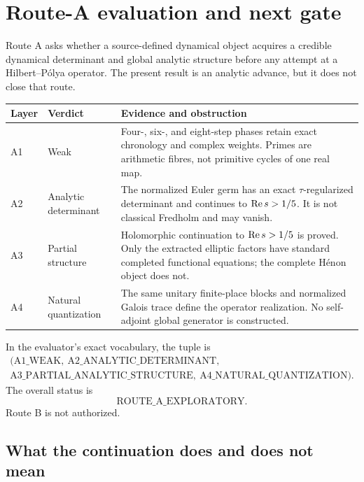 \section{Route-A evaluation and next gate}\label{sec:route-a}

Route A asks whether a source-defined dynamical object acquires a credible
dynamical determinant and global analytic structure before any attempt at a
Hilbert--P\'olya operator.  The present result is an analytic advance, but it
does not close that route.

\begin{center}
\begin{tabular}{@{}
>{\raggedright\arraybackslash}p{}
>{\raggedright\arraybackslash}p{}
>{\raggedright\arraybackslash}p{}@{}}
\toprule
Layer & Verdict & Evidence and obstruction\\
\midrule
A1 & Weak &
Four-, six-, and eight-step phases retain exact chronology and complex
weights.  Primes are arithmetic fibres, not primitive cycles of one real
map.\\
A2 & Analytic determinant &
The normalized Euler germ has an exact \(\tau\)-regularized determinant and
continues to \(\operatorname{Re} s>1/5\).  It is not classical Fredholm and may
vanish.\\
A3 & Partial structure &
Holomorphic continuation to \(\operatorname{Re} s>1/5\) is proved.  Only the extracted
elliptic factors have standard completed functional equations; the complete
H\'enon object does not.\\
A4 & Natural quantization &
The same unitary finite-place blocks and normalized Galois trace define the
operator realization.  No self-adjoint global generator is constructed.\\
\bottomrule
\end{tabular}
\end{center}

In the evaluator's exact vocabulary, the tuple is
\[
\begin{gathered}
(\mathrm{A1\_WEAK},\ \mathrm{A2\_ANALYTIC\_DETERMINANT},\\
\mathrm{A3\_PARTIAL\_ANALYTIC\_STRUCTURE},\
\mathrm{A4\_NATURAL\_QUANTIZATION}).
\end{gathered}
\]
The overall status is
\[
 \mathrm{ROUTE\_A\_EXPLORATORY}.
\]
Route B is not authorized.

\subsection{What the continuation does and does not mean}

